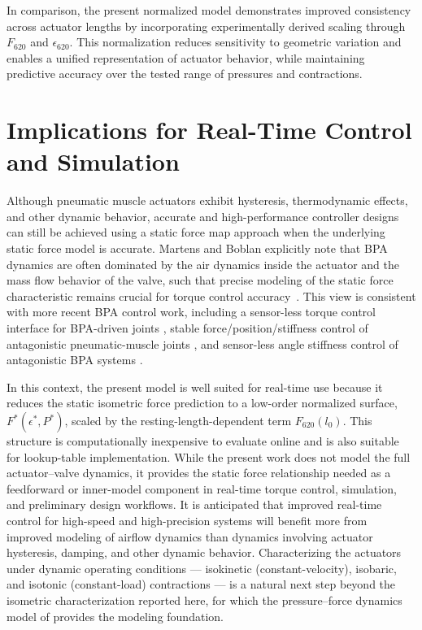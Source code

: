 In comparison, the present normalized model demonstrates improved consistency across actuator lengths by incorporating experimentally derived scaling through $F_{620}$ and $\epsilon_{620}$. This normalization reduces sensitivity to geometric variation and enables a unified representation of actuator behavior, while maintaining predictive accuracy over the tested range of pressures and contractions.


\section{Implications for Real-Time Control and Simulation}

Although pneumatic muscle actuators exhibit hysteresis, thermodynamic effects, and other dynamic behavior, accurate and high-performance controller designs can still be achieved using a static force map approach when the underlying static force model is accurate. Martens and Boblan explicitly note that BPA dynamics are often dominated by the air dynamics inside the actuator and the mass flow behavior of the valve, such that precise modeling of the static force characteristic remains crucial for torque control \mbox{accuracy \citep{martens_modeling_2017}.} This view is consistent with more recent BPA control work, including a sensor-less torque control interface for BPA-driven joints \citep{martens_framework_2018}, stable force/position/stiffness control of antagonistic pneumatic-muscle joints \citep{ugurlu2019stable, hunt_development_2017}, and sensor-less angle stiffness control of antagonistic BPA systems \citep{shinSensorlessAngleStiffness2022}. 

In this context, the present model is well suited for real-time use because it reduces the static isometric force prediction to a low-order normalized surface, $F^*(\epsilon^*,P^*)$, scaled by the resting-length-dependent term $F_{620}(l_0)$. This structure is computationally inexpensive to evaluate online and is also suitable for lookup-table implementation. While the present work does not model the full actuator--valve dynamics, it provides the static force relationship needed as a feedforward or inner-model component in real-time torque control, simulation, and preliminary design workflows. It is anticipated that improved real-time control for high-speed and high-precision systems will benefit more from improved modeling of airflow dynamics than dynamics involving actuator hysteresis, damping, and other dynamic behavior. Characterizing the actuators under dynamic operating conditions --- isokinetic (constant-velocity), isobaric, and isotonic (constant-load) contractions --- is a natural next step beyond the isometric characterization reported here, for which the pressure--force dynamics model of \citet{elzein_pressure_2025} provides the modeling foundation.



